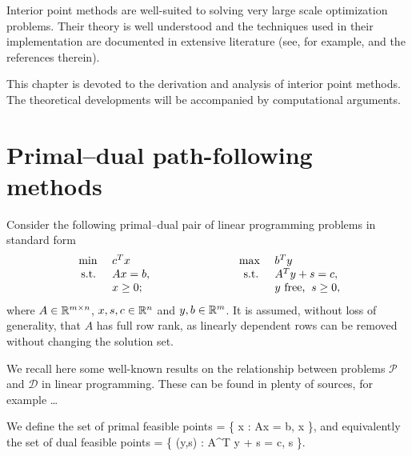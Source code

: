 
%
%
\label{ch:Ipm}

Interior point methods are well-suited to solving very
large scale optimization problems. Their theory is well understood
\cite{ipm:Wright97} and the techniques used in their implementation are
documented in extensive literature (see, for example, 
\cite{AndersenGondzioMeszarosXu,GondzioTerlaky} and the references therein).

This chapter is devoted to the derivation and analysis of interior 
point methods. 
The theoretical developments will be accompanied by computational 
arguments.


%
%
\section{Primal--dual path-following methods}
\label{sec:Derivation}


Consider the following primal--dual pair of linear programming problems 
in standard form
%
\begin{eqnarray} \label{eq:PrimalDualPair}
  \begin{array}{rlp{2cm}rl}
    \mbox{ min }  & c^T x  & & \mbox{ max }  & b^T y \\
    \mbox{ s.t. } & Ax = b,& & \mbox{ s.t. } & A^T y + s = c, \\
                  & x \geq 0; &  &   & y \mbox{ free,} \;\; s \geq 0,
  \end{array}
\end{eqnarray}
%
where $A \in \mathbb{R}^{m \times n}$, $x, s, c \in \mathbb{R}^{n}$ 
and $y, b \in \mathbb{R}^{m}$. It is assumed, without loss of generality,
that $A$ has full row rank, as linearly dependent rows can be
removed without changing the solution set.

We recall here some well-known results on the relationship between
problems $\mathcal{P}$ and $\mathcal{D}$ in linear programming. 
These can be found in plenty of sources, for example \ldots


We define the set of primal feasible points
\be \label{eq:PrimalFeasibleSet}
 = \{ x : Ax = b, \; x  \},
\ee
and equivalently the set of dual feasible points
\be \label{eq:DualFeasibleSet}
 = \{ (y,s) : A^T y + s = c, \; s  \}.
\ee

